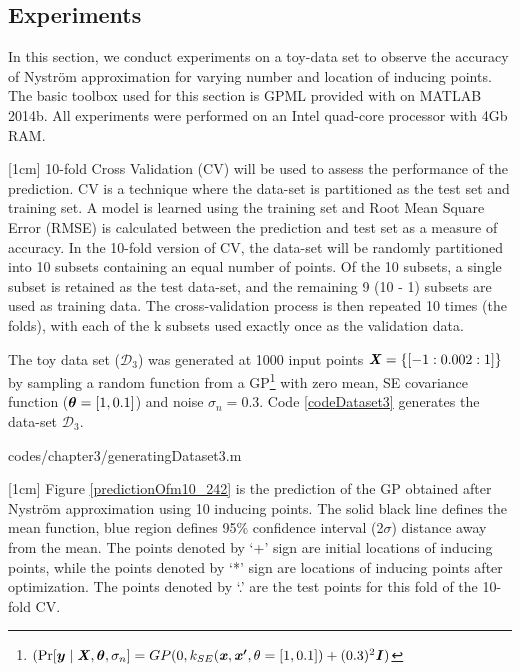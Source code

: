 \subsection{Experiments}\label{subsecNystromExperiments}
In this section, we conduct experiments on a toy-data set to observe the accuracy of Nystr\"{o}m approximation for varying number and location of inducing points. The basic toolbox used for this section is GPML provided with \cite{Rasmussen2005} on MATLAB 2014b. All experiments were performed on an Intel quad-core processor with 4Gb RAM. 

[1cm]
10-fold Cross Validation (CV) will be used to assess the performance of the prediction. CV is a technique where the data-set is partitioned as the test set and training set. A model is learned using the training set and Root Mean Square Error (RMSE) is calculated between the prediction and test set as a measure of accuracy. In the 10-fold version of CV, the data-set will be randomly partitioned into 10 subsets containing an equal number of points. Of the 10 subsets, a single subset is retained as the test data-set, and the remaining 9 (10 - 1) subsets are used as training data. The cross-validation process is then repeated 10 times (the folds), with each of the k subsets used exactly once as the validation data.

The toy data set ($\mathcal{D}_{3}$) was generated at 1000 input points $\bm{\mathit{X}} = \{[-1:0.002:1]\}$ by sampling a random function from a GP\footnote{$(\Pr[\boldsymbol{y} \mid \bm{\mathit{X}}, \boldsymbol{\theta}, \sigma_{n}] = GP(0, k_{SE}(\bm{\mathit{x}}, \bm{\mathit{x'}}, \theta = [1, 0.1]) + (0.3)^{2}\bm{\mathit{I}})$} with zero mean, SE covariance function ($\boldsymbol{\theta} = [1, 0.1]$) and noise $\sigma_{n} = 0.3$. Code \ref{codeDataset3} generates the data-set $\mathcal{D}_{3}$.

\begin{mdframed}[hidealllines=true,backgroundcolor=lightgray!20]

                    {codes/chapter3/generatingDataset3.m}
\end{mdframed}

[1cm]
Figure \ref{predictionOfm10_242} is the prediction of the GP obtained after Nystr\"{o}m approximation using 10 inducing points. The solid black line defines the mean function, blue region defines 95\% confidence interval (2$\sigma$) distance away from the mean. The points denoted by `+' sign are initial locations of inducing points, while the points denoted by `*' sign are locations of inducing points after optimization. The points denoted by `.' are the test points for this fold of the 10-fold CV. 

